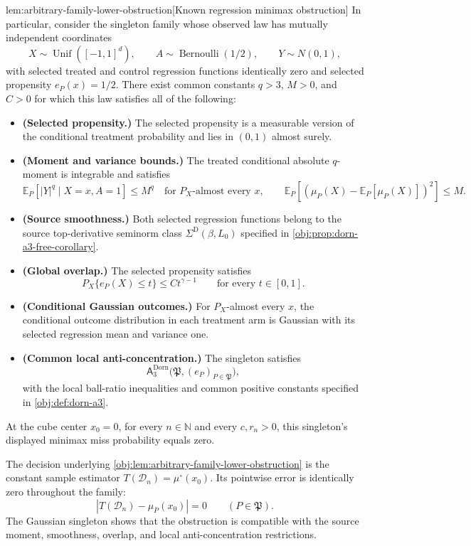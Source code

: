 \begin{lemmav}{lem:arbitrary-family-lower-obstruction}[Known regression minimax obstruction]
In particular, consider the singleton family whose observed law has mutually independent coordinates
\[
X\sim\operatorname{Unif}([-1,1]^d),
\qquad
A\sim\operatorname{Bernoulli}(1/2),
\qquad
Y\sim N(0,1),
\]
with selected treated and control regression functions identically zero and selected propensity \(e_P(x)=1/2\). There exist common constants \(q>3\), \(M>0\), and \(C>0\) for which this law satisfies all of the following:
\begin{itemize}
\item \textbf{(Selected propensity.)} The selected propensity is a measurable version of the conditional treatment probability and lies in \((0,1)\) almost surely.
\item \textbf{(Moment and variance bounds.)} The treated conditional absolute \(q\)-moment is integrable and satisfies
\[
\mathbb E_P\!\left[|Y|^q\mid X=x,A=1\right]\le M^q
\quad\text{for }P_X\text{-almost every }x,
\qquad
\mathbb E_P\!\left[
\left(\mu_P(X)-\mathbb E_P[\mu_P(X)]\right)^2
\right]\le M.
\]
\item \textbf{(Source smoothness.)} Both selected regression functions belong to the source top-derivative seminorm class \(\Sigma^{\mathrm D}(\beta,L_0)\) specified in \cref{obj:prop:dorn-a3-free-corollary}.
\item \textbf{(Global overlap.)} The selected propensity satisfies
\[
P_X\{e_P(X)\le t\}\le C t^{\gamma-1}
\qquad\text{for every }t\in[0,1].
\]
\item \textbf{(Conditional Gaussian outcomes.)} For \(P_X\)-almost every \(x\), the conditional outcome distribution in each treatment arm is Gaussian with its selected regression mean and variance one.
\item \textbf{(Common local anti-concentration.)} The singleton satisfies
\[
\mathsf A_{3}^{\mathrm{Dorn}}
\bigl(\mathfrak P,(e_P)_{P\in\mathfrak P}\bigr),
\]
with the local ball-ratio inequalities and common positive constants specified in \cref{obj:def:dorn-a3}.
\end{itemize}
At the cube center \(x_0=0\), for every \(n\in\mathbb N\) and every \(c,r_n>0\), this singleton's displayed minimax miss probability equals zero.
\end{lemmav}

The decision underlying \cref{obj:lem:arbitrary-family-lower-obstruction} is the constant sample estimator \(T(\mathcal D_n)=\mu^\circ(x_0)\). Its pointwise error is identically zero throughout the family:
\[
|T(\mathcal D_n)-\mu_P(x_0)|=0
\qquad(P\in\mathfrak P).
\]
The Gaussian singleton shows that the obstruction is compatible with the source moment, smoothness, overlap, and local anti-concentration restrictions.

